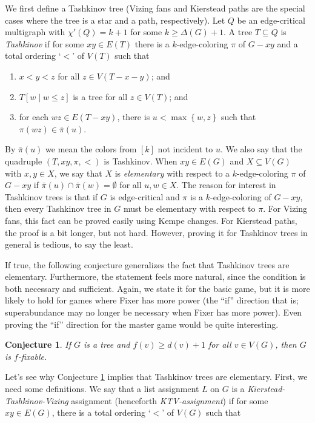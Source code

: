 \documentclass[12pt,reqno]{amsart}
\theoremstyle{plain}
\newtheorem{conj}[thm]{Conjecture}
\theoremstyle{definition}
\theoremstyle{remark}
\newcommand{\set}[1]{\left\{ #1 \right\}}
\newcommand{\irange}[1]{\left[#1\right]}
\newcommand{\parens}[1]{\left( #1 \right)}
\newcommand{\brackets}[1]{\left[ #1 \right]}
\begin{document}
We first define a Tashkinov tree (Vizing fans and Kierstead
paths are the special cases where the tree is a star and a path, respectively).
Let $Q$ be an edge-critical multigraph with $\chi'(Q) = k + 1$ for some $k \ge \Delta(G) + 1$. A tree $T \subseteq Q$ is \emph{Tashkinov} if for some $xy \in E(T)$ there is a $k$-edge-coloring $\pi$ of $G-xy$ and a total ordering `$<$' of $V(T)$ such that 

\begin{enumerate}
\item $x < y < z$ for all $z \in V(T - x - y)$; and
\item $T\brackets{w \mid w \le z}$ is a tree for all $z \in V(T)$; and
\item for each $wz \in E(T - xy)$, there is $u < \max\set{w, z}$ such that $\pi(wz) \in \bar{\pi}(u)$.
\end{enumerate}

By $\bar{\pi}(u)$ we mean the colors from $\irange{k}$ not incident to $u$.  We also say that the quadruple $\parens{T, xy, \pi, <}$ is Tashkinov.
When $xy \in E(G)$ and $X \subseteq V(G)$ with $x,y \in X$, we say that $X$ is
\emph{elementary} with respect to a $k$-edge-coloring $\pi$ of $G-xy$ if
$\bar{\pi}(u) \cap \bar{\pi}(w) = \emptyset$ for all $u, w \in X$.
The reason for interest in Tashkinov trees is that if $G$ is edge-critical and
$\pi$ is a $k$-edge-coloring of $G-xy$, then every Tashkinov tree in $G$ must
be elementary with respect to $\pi$.  For Vizing fans, this fact can be proved
easily using Kempe changes.  For Kierstead paths, the proof is a bit longer, but
not hard.  However, proving it for Tashkinov trees in general is tedious, to
say the least.

If true, the following conjecture generalizes the fact that Tashkinov
trees are elementary.  Furthermore, the statement feels more natural, since the
condition is both necessary and sufficient.
Again, we state it for the basic game, but it is more likely to
hold for games where Fixer has more power (the ``if'' direction that is; superabundance may no longer be necessary when Fixer has more power).  Even proving the ``if'' direction
for the master game would be quite interesting.

\begin{conj}
\label{GameTashkinovTrees}
If $G$ is a tree and $f(v) \ge d(v) + 1$ for all $v \in V(G)$, then $G$ is $f$-fixable.
\end{conj}

Let's see why Conjecture \ref{GameTashkinovTrees} implies that Tashkinov trees are elementary.  First, we need some definitions.  We say that a list assignment $L$ on $G$ is a \emph{Kierstead-Tashkinov-Vizing} assignment (henceforth \emph{KTV-assignment}) if for some $xy \in E(G)$, there is a total ordering `$<$' of $V(G)$ such that
\end{document}
